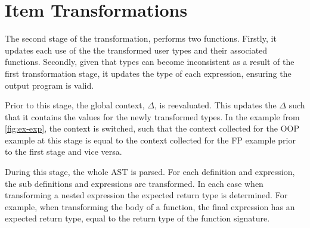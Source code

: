 \documentclass[ oneside,%
                    author={James Elgar},
                    degree={MEng},
                     title={Bidirectional transformer between functional and \\ object-oriented programming in Rust},
                  subtitle={}]{dissertation}
\begin{document}

\section{Item Transformations}
\label{sec:item-trans}

The second stage of the transformation, performs two functions. Firstly, it updates each use of the the transformed user types and their associated functions. Secondly, given that types can become inconsistent as a result of the first transformation stage, it updates the type of each expression, ensuring the output program is valid.


Prior to this stage, the global context, $\Delta$, is reevaluated. This updates the $\Delta$ such that it contains the values for the newly transformed types. In the example from \autoref{fig:ex-exp}, the context is switched, such that the context collected for the OOP example at this stage is equal to the context collected for the FP example prior to the first stage and vice versa.

During this stage, the whole AST is parsed. For each definition and expression, the sub definitions and expressions are transformed. In each case when transforming a nested expression the expected return type is determined. For example, when transforming the body of a function, the final expression has an expected return type, equal to the return type of the function signature. 

\end{document}
